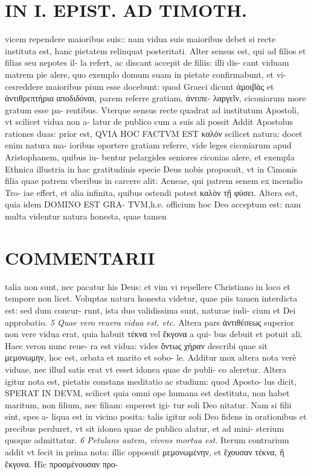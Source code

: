 \documentclass{article}
\begin{document}
\begin{pages}
\section*{IN I. EPIST. AD TIMOTH. }
\marginpar{[ p.123 ]}\pstart vicem rependere maioribus suis:: nam vidua suis maioribus debet si recte instituta est, hanc pietatem relinquat posteritati. Alter sensus est, qui ad filios et filias seu nepotes il- la refert, ac discant accepit de filiis: illi dis- cant viduam matrem pie alere, quo exemplo domum suam in pietate confirmabunt, et vi- cesreddere maioribus pium esse docebunt: quod Graeci dicunt ἁμοιβὰς et ἀντιθρεπτήρια αποδιδόναι, parem referre gratiam, ἀντιπε- λαργεῖν, ciconiarum more gratum esse pa- rentibus. Vterque sensus recte quadrat ad institutum Apostoli, vt scilicet vidua non a- latur de publico cum a suis ali possit  \pend\pstart Addit Apostolus rationes duas: prior est, QVIA HOC FACTVM EST καλόν scilicet natura: docet enim natura ma- ioribus oportere gratiam referre, vide leges ciconiarum apud Aristophanem, quibus iu- bentur pelargides seniores ciconias alere, et exempla Ethnica illustria in hac gratitudinis specie Deus nobis proposuit, vt in Cimonis filia quae patrem vberibus in carcere alit: Aeneae, qui patrem senem ex incendio Tro- iae effert, et alia infinita, quibus ostendi potest καλὸν τῇ φύσει.  \pend\pstart Altera est, quia idem DOMINO EST GRA- TVM,h.e. officium hoc Deo acceptum est: nam multa videntur natura honesta, quae tamen  \pend
\section*{COMMENTARII }
\marginpar{[ p.124 ]}\pstart talia non sunt, nec pacatur his Deus: et vim vi repellere Christiano in loco et tempore non licet. Voluptas natura honesta videtur, quae piis tamen interdicta est: sed dum concur- runt, ista duo validissima sunt, naturae iudi- cium et Dei approbatio.  \pend
\textit{5 Quae vero reuera vidua est, etc. }\pstart Altera pars ἀντιθέσεως superior non vere vidua erat, quia habuit τέκνα vel ἔκγονα a qui- bus debuit et potuit ali. Haec veron nunc reue- ra est vidua: vides ὄντως χήραν describi quae sit μεμονωμην, hoc est, orbata et marito et sobo- le. Additur mox altera nota verè viduae, nec illud satis erat vt esset idonea quae de publi- co aleretur. Altera igitur nota est, pietatis constans meditatio ac studium: quod Aposto- lus dicit, SPERAT IN DEVM, scilicet quia omni ope humana est destituta, non habet maritum, non filium, nec filiam: superest igi- tur soli Deo nitatur. Nam si filii sint, spes a- liqua est in vicino posita: talis igitur soli Deo fidens in orationibus et precibus perduret, vt sit idonea quae de publico alatur, et ad mini- sterium quoque admittatur.  \pend
\textit{6 Petulans autem, vivens mortua est. }\pstart Iterum contrarium addit vt fecit in prima nota: illic opposuit μεμονωμένην, et ἔχουσαν τέκνα, ἤ ἔκγονα.  Hîc προσμένουσαν προ-  \pend

\end{pages}
\end{document}
